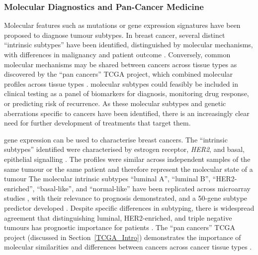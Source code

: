 \subsubsection{Molecular Diagnostics and Pan-Cancer Medicine}
Molecular features such as \glspl{mutation} or \gls{gene expression} signatures have been proposed to diagnose tumour subtypes. In breast cancer, several distinct ``\glspl{intrinsic subtype}'' have been identified, distinguished by molecular mechanisms,  with differences in malignancy and patient outcome \citep{Perou2000, Parker2009}. Conversely, common molecular mechanisms may be shared between cancers across tissue types as discovered by the ``\glspl{pan cancer}'' \gls{TCGA} project, which combined \glspl{molecular profile} across tissue types \citep{TCGA2013PAN}. \Glspl{molecular subtype} could feasibly be included in clinical testing as a panel of biomarkers for diagnosis, monitoring drug response, or predicting risk of recurrence. As these \glspl{molecular subtype} and genetic aberrations specific to cancers have been identified, there is an increasingly clear need for further development of \glspl{treatment} that target them.

\Gls{gene expression} can be used to characterise breast cancers. The ``\glspl{intrinsic subtype}'' identified were characterised by estrogen receptor, \textit{HER2}, and basal, epithelial signalling \citep{Perou2000}. The  profiles were similar across independent samples of the same tumour or the same patient and therefore represent the molecular state of a \gls{tumour} %
The molecular \glspl{intrinsic subtype} ``luminal A'', ``luminal B'', ``HER2-enriched'', ``basal-like'', and ``normal-like'' have been replicated across \gls{microarray} studies \citep{Hu2006}, with their relevance to prognosis demonstrated, and a 50-gene subtype predictor developed \citep{Sorlie2001, Parker2009}. %
%
Despite specific differences in subtyping, there is widespread agreement that distinguishing luminal, HER2-enriched, and triple negative \glspl{tumour} has prognostic importance for patients \citep{Dai2015}. %
The ``\glspl{pan cancer}'' \acrlong{TCGA} project (discussed in Section~\ref{TCGA_Intro}) demonstrates the importance of molecular similarities and differences between \glspl{cancer} across cancer tissue types \citep{TCGA2013PAN}.

